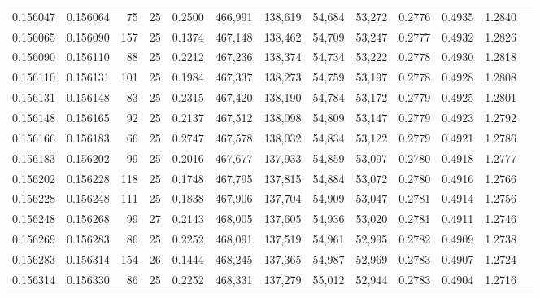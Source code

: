 \begin{tabular}{rrrrrrrrrrrrr}
0.156047 & 0.156064 &    75 &  25 &                                     0.2500 & 466,991 & 138,619 &  54,684 &  53,272 & 0.2776 & 0.4935 & 1.2840 \\
0.156065 & 0.156090 &   157 &  25 &                                     0.1374 & 467,148 & 138,462 &  54,709 &  53,247 & 0.2777 & 0.4932 & 1.2826 \\
0.156090 & 0.156110 &    88 &  25 &                                     0.2212 & 467,236 & 138,374 &  54,734 &  53,222 & 0.2778 & 0.4930 & 1.2818 \\
0.156110 & 0.156131 &   101 &  25 &                                     0.1984 & 467,337 & 138,273 &  54,759 &  53,197 & 0.2778 & 0.4928 & 1.2808 \\
0.156131 & 0.156148 &    83 &  25 &                                     0.2315 & 467,420 & 138,190 &  54,784 &  53,172 & 0.2779 & 0.4925 & 1.2801 \\
0.156148 & 0.156165 &    92 &  25 &                                     0.2137 & 467,512 & 138,098 &  54,809 &  53,147 & 0.2779 & 0.4923 & 1.2792 \\
0.156166 & 0.156183 &    66 &  25 &                                     0.2747 & 467,578 & 138,032 &  54,834 &  53,122 & 0.2779 & 0.4921 & 1.2786 \\
0.156183 & 0.156202 &    99 &  25 &                                     0.2016 & 467,677 & 137,933 &  54,859 &  53,097 & 0.2780 & 0.4918 & 1.2777 \\
0.156202 & 0.156228 &   118 &  25 &                                     0.1748 & 467,795 & 137,815 &  54,884 &  53,072 & 0.2780 & 0.4916 & 1.2766 \\
0.156228 & 0.156248 &   111 &  25 &                                     0.1838 & 467,906 & 137,704 &  54,909 &  53,047 & 0.2781 & 0.4914 & 1.2756 \\
0.156248 & 0.156268 &    99 &  27 &                                     0.2143 & 468,005 & 137,605 &  54,936 &  53,020 & 0.2781 & 0.4911 & 1.2746 \\
0.156269 & 0.156283 &    86 &  25 &                                     0.2252 & 468,091 & 137,519 &  54,961 &  52,995 & 0.2782 & 0.4909 & 1.2738 \\
0.156283 & 0.156314 &   154 &  26 &                                     0.1444 & 468,245 & 137,365 &  54,987 &  52,969 & 0.2783 & 0.4907 & 1.2724 \\
0.156314 & 0.156330 &    86 &  25 &                                     0.2252 & 468,331 & 137,279 &  55,012 &  52,944 & 0.2783 & 0.4904 & 1.2716 \\

\end{tabular}
